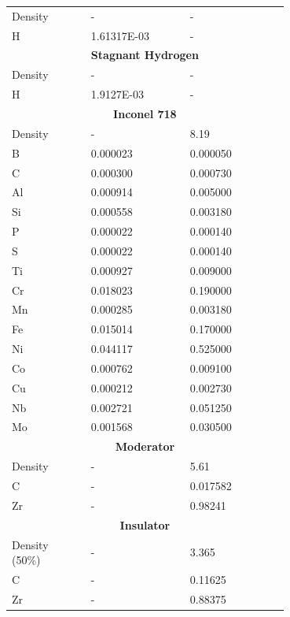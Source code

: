 \documentclass[8pt,a5paper]{article}
\begin{document}
\begin{longtable}{|m{0.2\linewidth}|m{0.25\linewidth}|m{0.25\linewidth}|}
    \hline
    \endlastfoot
    \multicolumn{3}{|c|}{\textbf{Support Element Coolant}}\\\hline
    Density & - & - \\
    H & \SI{1.61317E-03}{}& - \\\hline
    \multicolumn{3}{|c|}{\textbf{Stagnant Hydrogen}}\\\hline
    Density & - & - \\
    H & \SI{1.9127E-03}{}& - \\\hline
    \multicolumn{3}{|c|}{\textbf{Inconel 718}}\\\hline
    Density & - & \SI{8.19}{} \\
    B & \SI{0.000023}{} & \SI{0.000050}{} \\
    C & \SI{0.000300}{} & \SI{0.000730}{} \\
    Al & \SI{0.000914}{} & \SI{0.005000}{} \\
    Si & \SI{0.000558}{} & \SI{0.003180}{} \\
    P & \SI{0.000022}{} & \SI{0.000140}{} \\
    S & \SI{0.000022}{} & \SI{0.000140}{} \\
    Ti & \SI{0.000927}{} & \SI{0.009000}{} \\
    Cr & \SI{0.018023}{} & \SI{0.190000}{} \\
    Mn & \SI{0.000285}{} & \SI{0.003180}{} \\
    Fe & \SI{0.015014}{} & \SI{0.170000}{} \\
    Ni & \SI{0.044117}{} & \SI{0.525000}{} \\
    Co & \SI{0.000762}{} & \SI{0.009100}{} \\
    Cu & \SI{0.000212}{} & \SI{0.002730}{} \\
    Nb & \SI{0.002721}{} & \SI{0.051250}{} \\
    Mo & \SI{0.001568}{} & \SI{0.030500}{} \\\hline
    \multicolumn{3}{|c|}{\textbf{Moderator}}\\\hline
    Density & - & \SI{5.61}{} \\
    C & - & \SI{0.017582}{} \\
    Zr & - & \SI{0.98241}{} \\\hline
    \multicolumn{3}{|c|}{\textbf{Insulator}}\\\hline
    Density (50\%) & - & \SI{3.365}{} \\
    C & - & \SI{0.11625}{} \\
    Zr & - & \SI{0.88375}{} \\\hline

\end{longtable}
\end{document}
